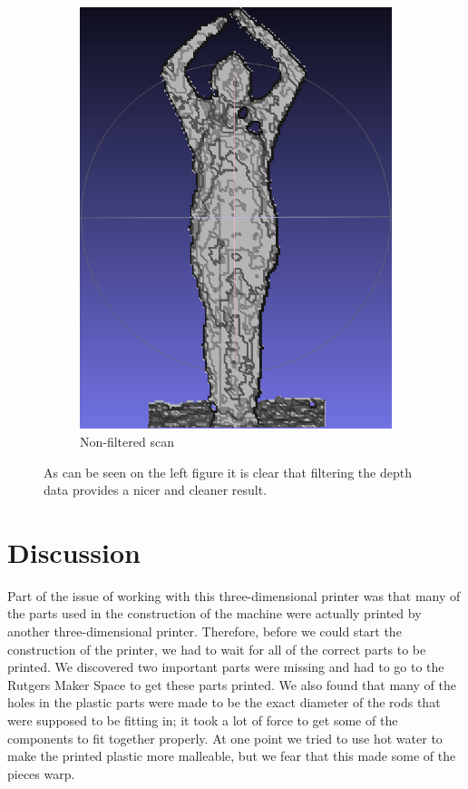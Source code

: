 \documentclass[pdftex,10.5pt]{report}
\begin{document}
\begin{figure}
\begin{subfigure}[H]{0.4\textwidth}
        \includegraphics[width=\textwidth]{figures/unfiltered}
        \caption{Non-filtered scan}
    \end{subfigure}
    \caption{
        As can be seen on the left figure it is clear that filtering the depth data provides a nicer and cleaner result.
    }
    \label{fig:cad}
\end{figure}

\section{Discussion}
Part of the issue of working with this three-dimensional printer was that many of the parts used in the construction of the machine were actually printed by another three-dimensional printer. Therefore, before we could start the construction of the printer, we had to wait for all of the correct parts to be printed. We discovered two important parts were missing and had to go to the Rutgers Maker Space to get these parts printed. We also found that many of the holes in the plastic parts were made to be the exact diameter of the rods that were supposed to be fitting in; it took a lot of force to get some of the components to fit together properly. At one point we tried to use hot water to make the printed plastic more malleable, but we fear that this made some of the pieces warp.
\end{document}
